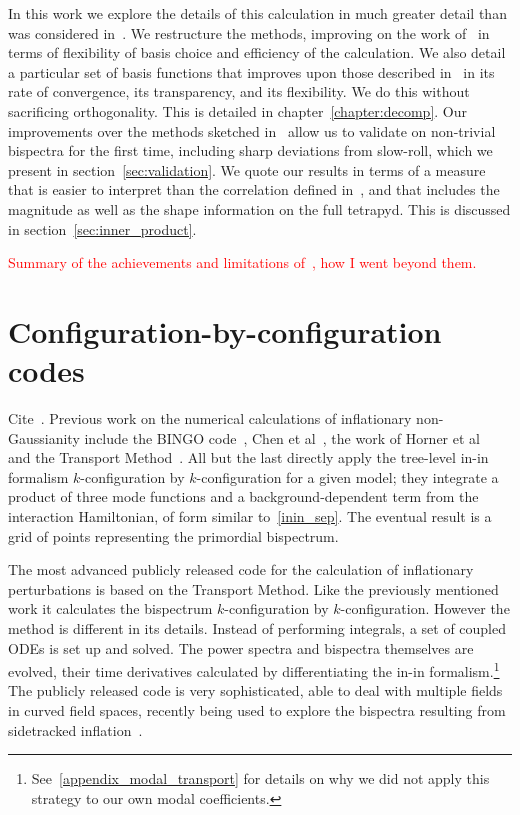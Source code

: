 In this work we explore the details of this calculation in much greater detail
than was considered in~\cite{Funakoshi}.
We restructure the methods, improving on the work of~\cite{Funakoshi} in terms
of flexibility of basis choice and efficiency of the calculation.
We also detail a particular set of basis functions that improves upon those described
in~\cite{Funakoshi} in its rate of convergence, its transparency,
and its flexibility.
We do this without sacrificing orthogonality.
This is detailed in chapter~\ref{chapter:decomp}.
Our improvements over the methods sketched in~\cite{Funakoshi} allow us to validate
on non-trivial bispectra for the first time, including sharp deviations from slow-roll, which we present in
section~\ref{sec:validation}.
We quote our results in terms of a measure that is
easier to interpret than the correlation defined in~\cite{Funakoshi},
and that includes the magnitude as well as the shape information
on the full tetrapyd.
This is discussed in section~\ref{sec:inner_product}.


    \textcolor{red}{Summary of the achievements and limitations of~\cite{Funakoshi}, how I went beyond them.}
    \section{Configuration-by-configuration codes}
    Cite~\cite{Ringeval}.
    Previous work on the numerical calculations of inflationary
non-Gaussianity include the BINGO code~\cite{BINGO},
Chen et al~\cite{chen_easther_lim_1,chen_easther_lim_2},
the work of Horner et al~\cite{horner_methods,horner_ng,horner_cs}
and the Transport Method~\cite{transport_main,transport_pytransport,transport_pytransport_2,transport_curved_3_point}.
All but the last directly apply the tree-level in-in formalism $k$-configuration by $k$-configuration for a given model;
they integrate a product of three mode functions and a background-dependent term from the interaction Hamiltonian, of form similar to~\eqref{inin_sep}.
The eventual result is a grid of points representing the primordial bispectrum.


The most advanced publicly released code for the calculation of inflationary perturbations
is based on the Transport Method.
Like the previously mentioned work it calculates the bispectrum $k$-configuration by $k$-configuration.
However the method is different in its details.
Instead of performing integrals,
a set of coupled ODEs is set up and solved.
The power spectra and bispectra themselves are evolved, their time derivatives calculated by
differentiating the in-in formalism.\footnote{
    See~\ref{appendix_modal_transport}
    for details on why we did not apply this strategy to our own modal coefficients.
    }
The publicly released code is very sophisticated,
able to deal with multiple fields in curved field spaces,
recently being used to explore the bispectra resulting from
sidetracked inflation~\cite{RP_1}.

